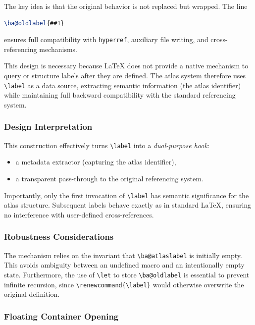 The key idea is that the original behavior is not replaced but wrapped. The line

\begin{lstlisting}[language=LaTeX]
\ba@oldlabel{##1}
\end{lstlisting}

ensures full compatibility with \texttt{hyperref}, auxiliary file writing, and cross-referencing mechanisms.

This design is necessary because \LaTeX{} does not provide a native mechanism to query or structure labels after they are defined. The atlas system therefore uses \lstinline|\label| as a data source, extracting semantic information (the atlas identifier) while maintaining full backward compatibility with the standard referencing system.
\subsubsection{Design Interpretation}

This construction effectively turns \lstinline|\label| into a \emph{dual-purpose hook}:

\begin{itemize}
\item a metadata extractor (capturing the atlas identifier),
\item a transparent pass-through to the original referencing system.
\end{itemize}

Importantly, only the first invocation of \lstinline|\label| has semantic significance for the atlas structure. Subsequent labels behave exactly as in standard \LaTeX{}, ensuring no interference with user-defined cross-references.

\subsubsection{Robustness Considerations}

The mechanism relies on the invariant that \lstinline|\ba@atlaslabel| is initially empty. This avoids ambiguity between an undefined macro and an intentionally empty state. Furthermore, the use of \lstinline|\let| to store \lstinline|\ba@oldlabel| is essential to prevent infinite recursion, since \lstinline|\renewcommand{\label}| would otherwise overwrite the original definition.
\subsubsection{Floating Container Opening}

